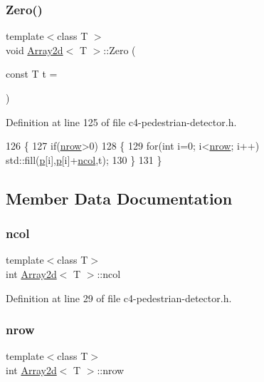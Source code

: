 \subsubsection{\texorpdfstring{Zero()}{Zero()}}
{\footnotesize\ttfamily template$<$class T $>$ \\
void \mbox{\hyperlink{class_array2d}{Array2d}}$<$ T $>$\+::Zero (\begin{DoxyParamCaption}\item[{const T}]{t = {} }\end{DoxyParamCaption})}



Definition at line 125 of file c4-\/pedestrian-\/detector.\+h.


\begin{DoxyCode}
126 \{
127     \textcolor{keywordflow}{if}(\mbox{\hyperlink{class_array2d_a373dd63664bee40ef720d183d03e5bdb}{nrow}}>0)
128     \{
129         \textcolor{keywordflow}{for}(\textcolor{keywordtype}{int} i=0; i<\mbox{\hyperlink{class_array2d_a373dd63664bee40ef720d183d03e5bdb}{nrow}}; i++) std::fill(\mbox{\hyperlink{class_array2d_ac7b70bc423364c43c7c174cdde515380}{p}}[i],\mbox{\hyperlink{class_array2d_ac7b70bc423364c43c7c174cdde515380}{p}}[i]+\mbox{\hyperlink{class_array2d_afe48cd05774cae5b6872324ae49e089b}{ncol}},t);
130     \}
131 \}
\end{DoxyCode}


\subsection{Member Data Documentation}
\mbox{\label{class_array2d_afe48cd05774cae5b6872324ae49e089b}} 
\subsubsection{\texorpdfstring{ncol}{ncol}}
{\footnotesize\ttfamily template$<$class T$>$ \\
int \mbox{\hyperlink{class_array2d}{Array2d}}$<$ T $>$\+::ncol}



Definition at line 29 of file c4-\/pedestrian-\/detector.\+h.

\mbox{\label{class_array2d_a373dd63664bee40ef720d183d03e5bdb}} 
\subsubsection{\texorpdfstring{nrow}{nrow}}
{\footnotesize\ttfamily template$<$class T$>$ \\
int \mbox{\hyperlink{class_array2d}{Array2d}}$<$ T $>$\+::nrow}



